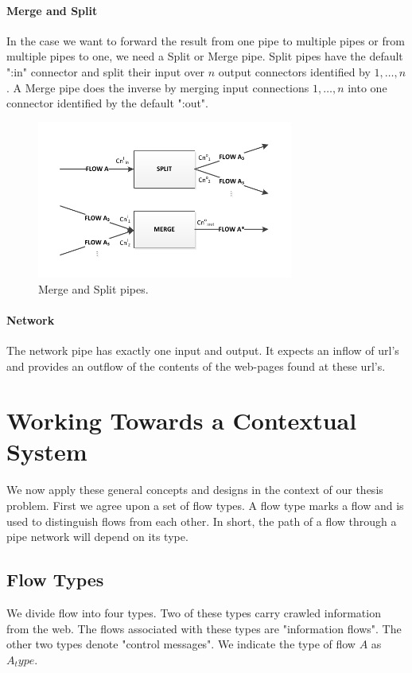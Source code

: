 \paragraph{Merge and Split} In the case we want to forward the result from one pipe to multiple pipes or from multiple pipes to one, we need a Split or Merge pipe. Split pipes have the default ":in" connector and split their input over $n$ output connectors identified by $1,\ldots,n$. A Merge pipe does the inverse by merging input connections $1,\ldots,n$ into one connector identified by the default ":out".

\begin{figure}[htb]
	\centering
		\includegraphics[width=0.75\textwidth]{fig/mergeandsplit}
	\caption{Merge and Split pipes.}
	\label{fig:mergeandsplit}
\end{figure}

\paragraph{Network} The network pipe has exactly one input and output. It expects an inflow of url's and provides an outflow of the contents of the web-pages found at these url's.

\section{Working Towards a Contextual System}

We now apply these general concepts and designs in the context of our thesis problem. First we agree upon a set of flow types. A flow type marks a flow and is used to distinguish flows from each other. In short, the path of a flow through a pipe network will depend on its type.

\subsection{Flow Types} We divide flow into four types. Two of these types carry crawled information from the web. The flows associated with these types are "information flows". The other two types denote "control messages". We indicate the type of flow $A$ as $A_type$.

